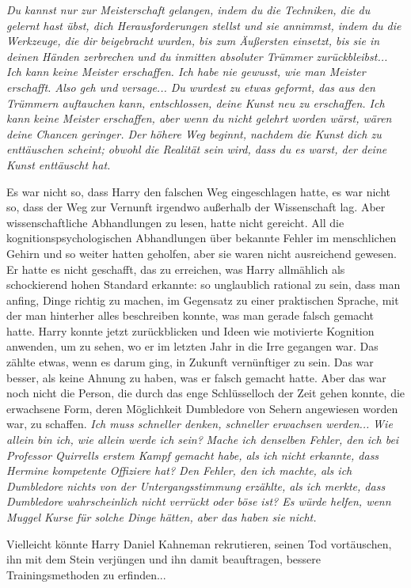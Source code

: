 \emph{Du kannst nur zur Meisterschaft gelangen, indem du die Techniken, die du
gelernt hast übst, dich Herausforderungen stellst und sie annimmst, indem du die
Werkzeuge, die dir beigebracht wurden, bis zum Äußersten einsetzt, bis sie in
deinen Händen zerbrechen und du inmitten absoluter Trümmer zurückbleibst... Ich
kann keine Meister erschaffen. Ich habe nie gewusst, wie man Meister erschafft.
Also geh und versage... Du wurdest zu etwas geformt, das aus den Trümmern
auftauchen kann, entschlossen, deine Kunst neu zu erschaffen. Ich kann keine
Meister erschaffen, aber wenn du nicht gelehrt worden wärst, wären deine Chancen
geringer. Der höhere Weg beginnt, nachdem die Kunst dich zu enttäuschen scheint;
obwohl die Realität sein wird, dass du es warst, der deine Kunst enttäuscht
hat.}

Es war nicht so, dass Harry den falschen Weg eingeschlagen hatte, es war nicht
so, dass der Weg zur Vernunft irgendwo außerhalb der Wissenschaft lag. Aber
wissenschaftliche Abhandlungen zu lesen, hatte nicht gereicht. All die
kognitionspsychologischen Abhandlungen über bekannte Fehler im menschlichen
Gehirn und so weiter hatten geholfen, aber sie waren nicht ausreichend gewesen.
Er hatte es nicht geschafft, das zu erreichen, was Harry allmählich als
schockierend hohen Standard erkannte: so unglaublich rational zu sein, dass man
anfing, Dinge richtig zu machen, im Gegensatz zu einer praktischen Sprache, mit
der man hinterher alles beschreiben konnte, was man gerade falsch gemacht hatte.
Harry konnte jetzt zurückblicken und Ideen wie \glqq{}motivierte Kognition\grqq{}
anwenden, um zu sehen, wo er im letzten Jahr in die Irre gegangen war. Das
zählte etwas, wenn es darum ging, in Zukunft vernünftiger zu sein. Das war
besser, als keine Ahnung zu haben, was er falsch gemacht hatte. Aber das war
noch nicht die Person, die durch das enge Schlüsselloch der Zeit gehen konnte,
die erwachsene Form, deren Möglichkeit Dumbledore von Sehern angewiesen worden
war, zu schaffen. \emph{ Ich muss schneller denken, schneller erwachsen
werden...}
\emph{Wie allein bin ich, wie allein werde ich sein?}
\emph{Mache ich denselben Fehler, den ich bei Professor Quirrells erstem Kampf
gemacht habe, als ich nicht erkannte, dass Hermine kompetente Offiziere hat? Den
Fehler, den ich machte, als ich Dumbledore nichts von der Untergangsstimmung
erzählte, als ich merkte, dass Dumbledore wahrscheinlich nicht verrückt oder
böse ist? Es würde helfen, wenn Muggel Kurse für solche Dinge hätten, aber das
haben sie nicht.}

Vielleicht könnte Harry Daniel Kahneman rekrutieren, seinen Tod vortäuschen, ihn
mit dem Stein verjüngen und ihn damit beauftragen, bessere Trainingsmethoden zu
erfinden...

